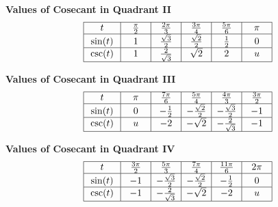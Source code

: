 \documentclass[nooutcomes, noauthor]{ximera}
\begin{document}
\begin{center}
\textbf{Values of Cosecant in Quadrant II}
\renewcommand*{\arraystretch}{2.5}
\setlength{\arrayrulewidth}{0.5mm}
\setlength{\tabcolsep}{18pt}
\[
\begin{array}{|>{\centering\arraybackslash$} p{1cm} <{$} | >{\centering\arraybackslash$} p{.75cm} <{$} |  >{\centering\arraybackslash$} p{.75cm} <{$} |  >{\centering\arraybackslash$} p{.75cm} <{$} |  >{\centering\arraybackslash$} p{.75cm} <{$} |  >{\centering\arraybackslash$} p{.75cm} <{$} |}
\hline 
t & \frac{\pi}{2} & \frac{2\pi}{3} & \frac{3\pi}{4} & \frac{5\pi}{6} & \pi\\
\hline
\sin(t) & 1 & \frac{\sqrt{3}}{2} & \frac{\sqrt{2}}{2} & \frac{1}{2} & 0\\
\hline
\csc(t) & 1 & \frac{2}{\sqrt{3}}& \sqrt{2} & 2 & u\\
\hline 
\end{array}
\]
\end{center}

\begin{center}
\textbf{Values of Cosecant in Quadrant III}
\renewcommand*{\arraystretch}{2.5}
\setlength{\arrayrulewidth}{0.5mm}
\setlength{\tabcolsep}{18pt}
\[
\begin{array}{|>{\centering\arraybackslash$} p{1cm} <{$} | >{\centering\arraybackslash$} p{.75cm} <{$} |  >{\centering\arraybackslash$} p{.75cm} <{$} |  >{\centering\arraybackslash$} p{.75cm} <{$} |  >{\centering\arraybackslash$} p{.75cm} <{$} |  >{\centering\arraybackslash$} p{.75cm} <{$} |}
\hline 
t & \pi & \frac{7\pi}{6} & \frac{5\pi}{4} & \frac{4\pi}{3} & \frac{3\pi}{2}\\
\hline
\sin(t) & 0 & -\frac{1}{2} &-\frac{\sqrt{2}}{2} & -\frac{\sqrt{3}}{2} & -1\\
\hline
\csc(t) & u & -2& -\sqrt{2} & -\frac{2}{\sqrt{3}}& -1\\
\hline 
\end{array}
\]
\end{center}

\begin{center}
\textbf{Values of Cosecant in Quadrant IV}
\renewcommand*{\arraystretch}{2.5}
\setlength{\arrayrulewidth}{0.5mm}
\setlength{\tabcolsep}{18pt}
\[
\begin{array}{|>{\centering\arraybackslash$} p{1cm} <{$} | >{\centering\arraybackslash$} p{.75cm} <{$} |  >{\centering\arraybackslash$} p{.75cm} <{$} |  >{\centering\arraybackslash$} p{.75cm} <{$} |  >{\centering\arraybackslash$} p{.75cm} <{$} |  >{\centering\arraybackslash$} p{.75cm} <{$} |}
\hline 
t & \frac{3\pi}{2} & \frac{5\pi}{3} & \frac{7\pi}{4} & \frac{11\pi}{6} & 2\pi\\
\hline
\sin(t) & -1 & -\frac{\sqrt{3}}{2} & -\frac{\sqrt{2}}{2} & -\frac{1}{2} & 0\\
\hline
\csc(t) & -1 & -\frac{2}{\sqrt{3}}& -\sqrt{2} & -2 & u\\
\hline 
\end{array}
\]
\end{center}
\end{document}
